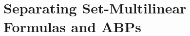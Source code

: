 \chapter{Separating Set-Multilinear Formulas and ABPs}\label{chap:multilinear-abp-form-sep}

\cite{TLS22}


